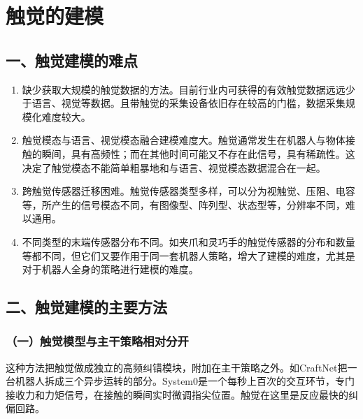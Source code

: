 \clearpage

\hypertarget{ux89e6ux89c9ux7684ux5efaux6a21}{%
\section{触觉的建模}\label{ux89e6ux89c9ux7684ux5efaux6a21}}

\hypertarget{ux4e00ux89e6ux89c9ux5efaux6a21ux7684ux96beux70b9}{%
\subsection{一、触觉建模的难点}\label{ux4e00ux89e6ux89c9ux5efaux6a21ux7684ux96beux70b9}}

\begin{enumerate}
\def\labelenumi{\arabic{enumi}.}
\item
  缺少获取大规模的触觉数据的方法。目前行业内可获得的有效触觉数据远远少于语言、视觉等数据。且带触觉的采集设备依旧存在较高的门槛，数据采集规模化难度较大。
\item
  触觉模态与语言、视觉模态融合建模难度大。触觉通常发生在机器人与物体接触的瞬间，具有高频性；而在其他时间可能又不存在此信号，具有稀疏性。这决定了触觉模态不能简单粗暴地和与语言、视觉模态数据混合在一起。
\item
  跨触觉传感器迁移困难。触觉传感器类型多样，可以分为视触觉、压阻、电容等，所产生的信号模态不同，有图像型、阵列型、状态型等，分辨率不同，难以通用。
\item
  不同类型的末端传感器分布不同。如夹爪和灵巧手的触觉传感器的分布和数量等都不同，但它们又要作用于同一套机器人策略，增大了建模的难度，尤其是对于机器人全身的策略进行建模的难度。
\end{enumerate}

\hypertarget{ux4e8cux89e6ux89c9ux5efaux6a21ux7684ux4e3bux8981ux65b9ux6cd5}{%
\subsection{二、触觉建模的主要方法}\label{ux4e8cux89e6ux89c9ux5efaux6a21ux7684ux4e3bux8981ux65b9ux6cd5}}

\hypertarget{ux4e00ux89e6ux89c9ux6a21ux578bux4e0eux4e3bux5e72ux7b56ux7565ux76f8ux5bf9ux5206ux5f00}{%
\subsubsection{（一）触觉模型与主干策略相对分开}\label{ux4e00ux89e6ux89c9ux6a21ux578bux4e0eux4e3bux5e72ux7b56ux7565ux76f8ux5bf9ux5206ux5f00}}

这种方法把触觉做成独立的高频纠错模块，附加在主干策略之外。如CraftNet把一台机器人拆成三个异步运转的部分。System0是一个每秒上百次的交互环节，专门接收力和力矩信号，在接触的瞬间实时微调指尖位置。触觉在这里是反应最快的纠偏回路。

